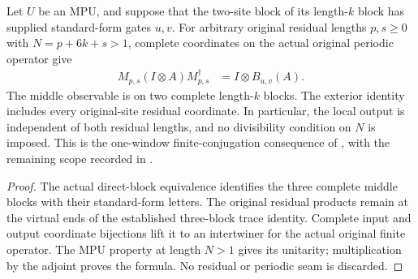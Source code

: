 \begin{lemma}
    \label{thm:mpu_finite_heisenberg_original_residuals}
    \leanok
    Let $U$ be an MPU, and suppose that the two-site block of its length-$k$
    block has supplied standard-form gates $u,v$. For arbitrary original
    residual lengths $p,s\ge0$ with $N=p+6k+s>1$, complete coordinates on
    the actual original periodic operator give
    \begin{align}
        M_{p,s}(I\otimes A)M_{p,s}^\dagger
         & =I\otimes B_{u,v}(A).
        \label{eq:mpu_finite_heisenberg_original_residuals}
    \end{align}
    The middle observable is on two complete length-$k$ blocks. The
    exterior identity includes every original-site residual coordinate.
    In particular, the local output is independent of both residual
    lengths, and no divisibility condition on $N$ is imposed.
    This is the one-window finite-conjugation consequence of
    \cite[lines~2300--2306]{Cirac2017MPU}, with the remaining scope recorded
    in \cite{gap:mpu_qca_complete_block_heisenberg_scope}.
\end{lemma}
\begin{proof}\leanok
    The actual direct-block equivalence identifies the three complete
    middle blocks with their standard-form letters. The original residual
    products remain at the virtual ends of the established three-block
    trace identity. Complete input and output coordinate bijections lift
    it to an intertwiner for the actual original finite operator. The MPU
    property at length $N>1$ gives its unitarity; multiplication by the
    adjoint proves the formula. No residual or periodic seam is discarded.
\end{proof}


